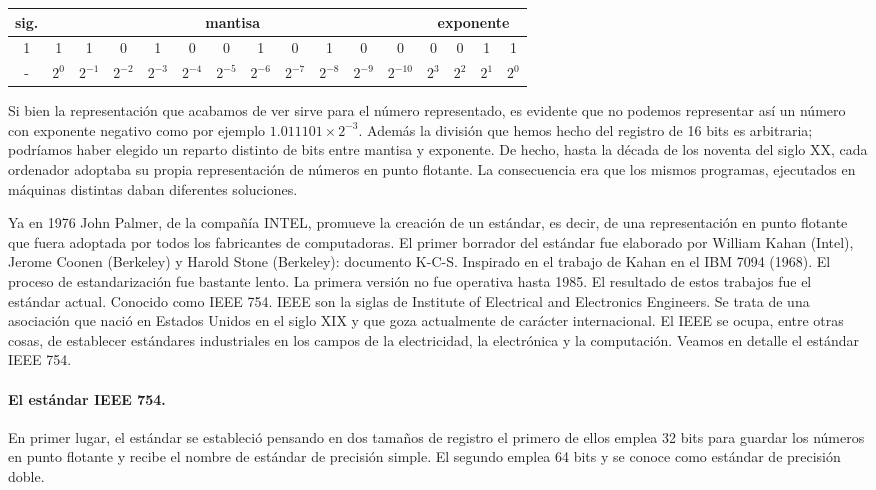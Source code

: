 \begin{table}
\begin{tabular}{|c||c|c|c|c|c|c|c|c|c|c|c||c|c|c|c|}
\hline
sig.&\multicolumn{11}{c||}{mantisa}&\multicolumn{4}{c|}{exponente}\\
\hline
1&1&1&0&1&0&0&1&0&1&0&0&0&0&1&1\\
\hline
-&$2^{0}$&$2^{-1}$&$2^{-2}$&$2^{-3}$&$2^{-4}$&$2^{-5}$&$2^{-6}$&$2^{-7}$&$2^{-8}$&$2^{-9}$&$2^{-10}$&$2^{3}$&$2^{2}$&$2^{1}$&$2^{0}$\\
\hline
\end{tabular}
\end{table}

\begin{paracol}{2}
Si bien la representación que acabamos de ver sirve para el número representado, es evidente que no podemos representar así un número con exponente negativo como por ejemplo $1.011101\times 2^{-3}$. Además la división que hemos hecho del registro de 16 bits es arbitraria; podríamos haber elegido un reparto distinto de bits entre mantisa y exponente. De hecho, hasta la década de los noventa del siglo XX, cada ordenador adoptaba su propia representación de números en punto flotante. La consecuencia era que los mismos programas, ejecutados en máquinas distintas daban diferentes soluciones. 

Ya en 1976 John Palmer, de la compañía INTEL, promueve la creación de un estándar, es decir, de una representación en punto flotante que fuera adoptada por todos los fabricantes de computadoras. El primer borrador del estándar fue elaborado por William Kahan (Intel), Jerome Coonen (Berkeley) y Harold Stone (Berkeley): documento K-C-S. Inspirado en el trabajo de Kahan en el IBM 7094 (1968). El proceso de estandarización fue bastante lento. La primera versión no fue operativa hasta 1985. El resultado de estos trabajos fue el estándar actual. Conocido como IEEE 754. IEEE son la siglas de Institute of Electrical and Electronics Engineers. Se trata de una asociación que nació en Estados Unidos en el siglo XIX y que goza actualmente de carácter internacional. El IEEE se ocupa, entre otras cosas, de establecer estándares industriales en los campos de la electricidad, la electrónica y la computación. Veamos en detalle el estándar IEEE 754.

\paragraph*{El estándar IEEE 754.}
En primer lugar, el estándar se estableció pensando en dos tamaños de registro el primero de ellos emplea 32 bits para guardar los números en punto flotante y recibe el nombre de estándar de precisión simple. El segundo emplea 64 bits y se conoce como estándar de precisión doble.


\end{paracol}
